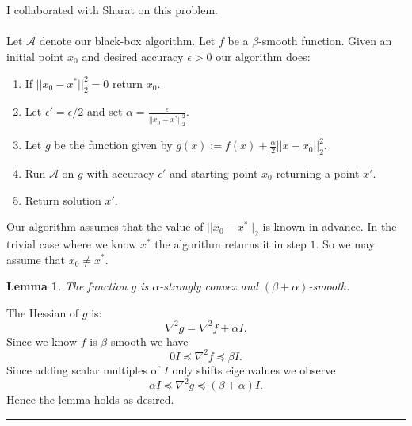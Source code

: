 \documentclass[letterpaper,12pt,oneside,onecolumn]{article}
\newcommand{\cA}{\mathcal{A}} \newcommand{\cB}{\mathcal{B}}
\newenvironment{proof}{{\bf Proof:  }}{\hfill\rule{2mm}{2mm}}
\newtheorem{lemma}[fact]{Lemma}
\begin{document}




\section{}
\paragraph{}
I collaborated with Sharat on this problem.
\paragraph{}
Let $\cA$ denote our black-box algorithm. Let $f$ be a $\beta$-smooth function. Given an initial point $x_0$ and desired accuracy $\epsilon > 0$ our algorithm does:
\begin{enumerate}
\item If $||x_0 - x^*||_2^2 = 0$ return $x_0$.
\item Let $\epsilon' = \epsilon/2$ and set $\alpha = \frac{\epsilon}{||x_0 - x^*||_2^2}$.
\item Let $g$ be the function given by $g(x) := f(x) + \frac{\alpha}{2}||x - x_0||_2^2$.
\item Run $\cA$ on $g$ with accuracy $\epsilon'$ and starting point $x_0$ returning a point $x'$.
\item Return solution $x'$.
\end{enumerate} 
Our algorithm assumes that the value of $||x_0 - x^*||_2$ is known in advance. In the trivial case where we know $x^*$ the algorithm returns it in step $1$. So we may assume that $x_0 \neq x^*$.
\begin{lemma}\label{lemma:convex-smooth}
The function $g$ is $\alpha$-strongly convex and $(\beta + \alpha)$-smooth.
\end{lemma}
\begin{proof}
The Hessian of $g$ is:
$$\nabla^2 g = \nabla^2 f + \alpha I.$$
Since we know $f$ is $\beta$-smooth we have
$$0I \preccurlyeq \nabla^2 f \preccurlyeq \beta I.$$
Since adding scalar multiples of $I$ only shifts eigenvalues we observe
$$\alpha I \preccurlyeq \nabla^2 g \preccurlyeq (\beta + \alpha) I.$$
Hence the lemma holds as desired. 
\end{proof}
\end{document}
